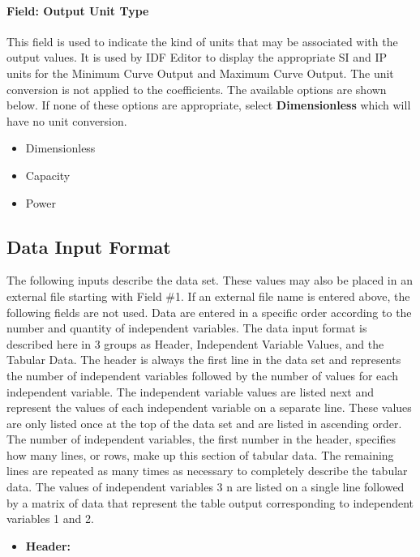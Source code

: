 \paragraph{Field: Output Unit Type}\label{field-output-unit-type-2-000}

This field is used to indicate the kind of units that may be associated with the output values. It is used by IDF Editor to display the appropriate SI and IP units for the Minimum Curve Output and Maximum Curve Output. The unit conversion is not applied to the coefficients. The available options are shown below. If none of these options are appropriate, select \textbf{Dimensionless} which will have no unit conversion.

\begin{itemize}
\item
  Dimensionless
\item
  Capacity
\item
  Power
\end{itemize}

\subsection{Data Input Format}\label{data-input-format}

The following inputs describe the data set. These values may also be placed in an external file starting with Field \#1. If an external file name is entered above, the following fields are not used. Data are entered in a specific order according to the number and quantity of independent variables. The data input format is described here in 3 groups as Header, Independent Variable Values, and the Tabular Data. The header is always the first line in the data set and represents the number of independent variables followed by the number of values for each independent variable. The independent variable values are listed next and represent the values of each independent variable on a separate line. These values are only listed once at the top of the data set and are listed in ascending order. The number of independent variables, the first number in the header, specifies how many lines, or rows, make up this section of tabular data. The remaining lines are repeated as many times as necessary to completely describe the tabular data. The values of independent variables 3 n are listed on a single line followed by a matrix of data that represent the table output corresponding to independent variables 1 and 2.

\begin{itemize}
\tightlist
\item
  \textbf{Header:}
\end{itemize}

